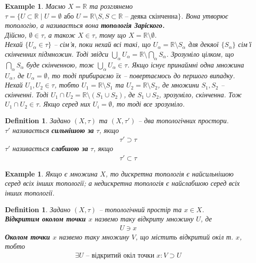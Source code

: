 \documentclass[a4paper, 10pt]{article}
\theoremstyle{theoremdd}
\newtheorem{definition}[theorem]{Definition}
\newtheorem{example}[theorem]{Example}
\begin{document}
\begin{example}
Маємо $X = \mathbb{R}$ та розглянемо $\tau = \{U \subset \mathbb{R} \mid U = \emptyset \text{ або } U = \mathbb{R} \setminus S, S \subset \mathbb{R} \text{ -- деяка скінченна}\}$. Вона утворює топологію, а називається вона \textbf{топологія Заріского.}\\
Дійсно, $\emptyset \in \tau$, а також $X \in \tau$, тому що $X = \mathbb{R} \setminus \emptyset$.\\
Нехай $\{U_\alpha \in \tau\}$ -- сім'я, поки нехай всі такі, що $U_\alpha = \mathbb{R} \setminus S_\alpha$ для декяої $\{S_\alpha\}$ сім'ї скінченних підмножин. Тоді звідси $\displaystyle\bigcup_\alpha U_\alpha = \mathbb{R} \setminus \bigcap_\alpha S_\alpha$. Зрозуміло цілком, що $\displaystyle\bigcap_\alpha S_\alpha$ буде скінченною, тож $\displaystyle\bigcup_\alpha U_\alpha \in \tau$. Якщо існує принаймні одна множина $U_\alpha$, де $U_\alpha = \emptyset$, то тоді прибираємо їх -- повертаємось до першого випадку.\\
Нехай $U_1,U_2 \in \tau$, тобто $U_1 = \mathbb{R} \setminus S_1$ та $U_2 = \mathbb{R} \setminus S_2$, де множини $S_1,S_2$ -- скінченні. Тоді $U_1 \cap U_2 = \mathbb{R} \setminus (S_1 \cup S_2)$, де $S_1 \cup S_2$, зрозуміло, скінченна. Тож $U_1 \cap U_2 \in \tau$. Якщо серед них $U_i = \emptyset$, то тоді все зрозуміло.
\end{example}

\begin{definition}
Задано $(X,\tau)$ та $(X,\tau')$ -- два топологічних простори.\\
$\tau'$ називається \textbf{сильнішою за} $\tau$, якщо
\begin{align*}
\tau' \supset \tau
\end{align*}
$\tau'$ називається \textbf{слабшою за} $\tau$, якщо
\begin{align*}
\tau' \subset \tau
\end{align*}
\end{definition}

\begin{example}
Якщо є множина $X$, то дискретна топологія є найсильнішою серед всіх інших топології; а недискретна топологія є найслабшою серед всіх інших топології.
\end{example}

\begin{definition}
Задано $(X,\tau)$ -- топологічний простір та $x \in X$.\\
\textbf{Відкритим околом точки $x$} назвемо таку відкриту множину $U$, де
\begin{align*}
U \ni x
\end{align*}
\textbf{Околом точки $x$} назвемо таку множину $V$, що містить відкритий окіл т. $x$, тобто
\begin{align*}
\exists U \text{ -- відкритий окіл точки } x: V \supset U
\end{align*}
\end{definition}
\end{document}
